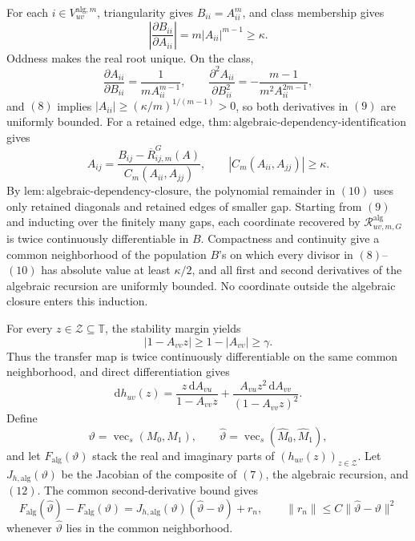 For each \(i\in V_{uv}^{\mathrm{alg},m}\), triangularity gives \(B_{ii}=A_{ii}^m\), and class membership gives
\[
 \left|\frac{\partial B_{ii}}{\partial A_{ii}}\right|
 =m|A_{ii}|^{m-1}\ge\kappa.
\tag{8}
\]
Oddness makes the real root unique.  On the class,
\[
 \frac{\partial A_{ii}}{\partial B_{ii}}
 =\frac{1}{mA_{ii}^{m-1}},
 \qquad
 \frac{\partial^2 A_{ii}}{\partial B_{ii}^2}
 =-\frac{m-1}{m^2A_{ii}^{2m-1}},
\tag{9}
\]
and \((8)\) implies \(|A_{ii}|\ge(\kappa/m)^{1/(m-1)}>0\), so both derivatives in \((9)\) are uniformly bounded.  For a retained edge, \(\mathrm{thm{:}algebraic\mbox{-}dependency\mbox{-}identification}\) gives
\[
 A_{ij}
 =\frac{B_{ij}-\overline R^{G}_{ij,m}(A)}{C_m(A_{ii},A_{jj})},
 \qquad
 |C_m(A_{ii},A_{jj})|\ge\kappa.
\tag{10}
\]
By \(\mathrm{lem{:}algebraic\mbox{-}dependency\mbox{-}closure}\), the polynomial remainder in \((10)\) uses only retained diagonals and retained edges of smaller gap.  Starting from \((9)\) and inducting over the finitely many gaps, each coordinate recovered by \(\mathscr R^{\mathrm{alg}}_{uv,m,G}\) is twice continuously differentiable in \(B\).  Compactness and continuity give a common neighborhood of the population \(B\)'s on which every divisor in \((8)\)--\((10)\) has absolute value at least \(\kappa/2\), and all first and second derivatives of the algebraic recursion are uniformly bounded.  No coordinate outside the algebraic closure enters this induction.

For every \(z\in\mathcal Z\subseteq\mathbb T\), the stability margin yields
\[
 |1-A_{vv}z|\ge1-|A_{vv}|\ge\gamma.
\tag{11}
\]
Thus the transfer map is twice continuously differentiable on the same common neighborhood, and direct differentiation gives
\[
 \mathrm dh_{uv}(z)
 =\frac{z\,\mathrm dA_{vu}}{1-A_{vv}z}
  +\frac{A_{vu}z^2\,\mathrm dA_{vv}}{(1-A_{vv}z)^2}.
\tag{12}
\]
Define
\[
 \vartheta=\operatorname{vec}_{s}(M_0,M_1),
 \qquad
 \widehat\vartheta=\operatorname{vec}_{s}(\widehat M_0,\widehat M_1),
\]
and let \(F_{\mathrm{alg}}(\vartheta)\) stack the real and imaginary parts of \((h_{uv}(z))_{z\in\mathcal Z}\).  Let \(J_{h,\mathrm{alg}}(\vartheta)\) be the Jacobian of the composite of \((7)\), the algebraic recursion, and \((12)\).  The common second-derivative bound gives
\[
 F_{\mathrm{alg}}(\widehat\vartheta)-F_{\mathrm{alg}}(\vartheta)
 =J_{h,\mathrm{alg}}(\vartheta)(\widehat\vartheta-\vartheta)+r_n,
 \qquad
 \|r_n\|\le C\|\widehat\vartheta-\vartheta\|^2
\tag{13}
\]
whenever \(\widehat\vartheta\) lies in the common neighborhood.

